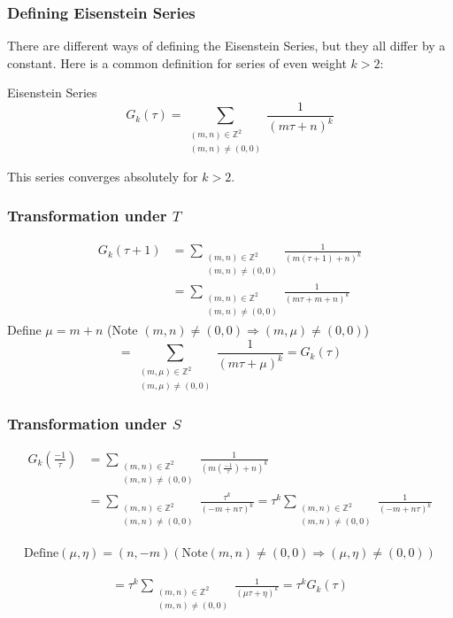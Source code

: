 \documentclass{beamer}
\begin{document}
\begin{frame}

\frametitle{Defining Eisenstein Series}
There are different ways of defining the Eisenstein Series, but they all differ by a constant. Here is a common definition for series of even weight $k>2$: 
\begin{block}{Eisenstein Series}
$$G_k(\tau) = \sum_{\substack{(m,n) \in \mathbb{Z}^2 \\ (m,n) \neq (0,0)}}  \frac{1}{(m \tau + n)^k}$$
\end{block}
This series converges absolutely for $k>2$.

\end{frame}

\begin{frame}
\frametitle{Transformation under $T$}

\begin{align*}
G_k(\tau + 1) &= \sum_{\substack{(m,n) \in \mathbb{Z}^2 \\ (m,n) \neq (0,0)}}  \frac{1}{(m (\tau +1) + n)^k} \\
& = \sum_{\substack{(m,n) \in \mathbb{Z}^2 \\ (m,n) \neq (0,0)}}  \frac{1}{(m \tau + m +  n)^k} 
\end{align*}
Define $\mu=m+n$ (Note $(m,n) \neq (0,0) \Rightarrow (m, \mu) \neq (0,0)$) \\
$$=  \sum_{\substack{(m,\mu) \in \mathbb{Z}^2 \\ (m,\mu) \neq (0,0)}}  \frac{1}{(m \tau + \mu)^k} = G_k(\tau)$$


\end{frame}

\begin{frame}
\frametitle{Transformation under $S$}

\begin{align*}
G_k \left( \frac{-1}{\tau} \right) &= \sum_{\substack{(m,n) \in \mathbb{Z}^2 \\ (m,n) \neq (0,0)}}  \frac{1}{(m (\frac{-1}{\tau}) + n)^k} \\
&= \sum_{\substack{(m,n) \in \mathbb{Z}^2 \\ (m,n) \neq (0,0)}}  \frac{\tau^k}{(-m + n \tau)^k} = \tau^k \sum_{\substack{(m,n) \in \mathbb{Z}^2 \\ (m,n) \neq (0,0)}}  \frac{1}{(-m + n \tau)^k}
\end{align*}

\begin{align*}
\text{Define} (\mu, \eta) = (n, -m) (\text{Note} (m,n) \neq (0,0) \Rightarrow (\mu, \eta) \neq (0,0)) 
\end{align*}

\begin{align*}
= \tau^k \sum_{\substack{(m,n) \in \mathbb{Z}^2 \\ (m,n) \neq (0,0)}}  \frac{1}{(\mu \tau + \eta)^k} = \tau^k G_k(\tau)
\end{align*}

\end{frame}
\end{document}
